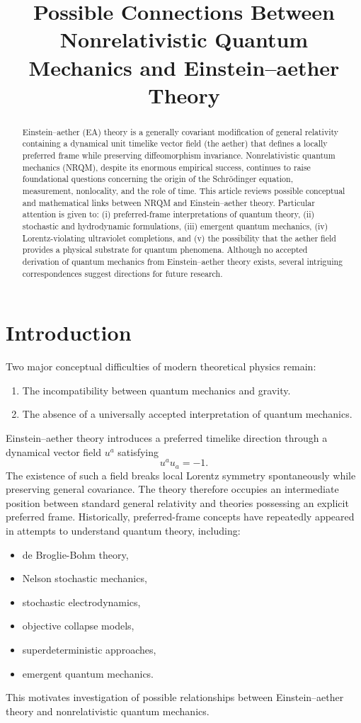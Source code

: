 \documentclass[11pt]{article}
\title{Possible Connections Between Nonrelativistic Quantum Mechanics and Einstein--aether Theory}
\author{}
\date{}
\begin{document}
\maketitle
\begin{abstract}
Einstein--aether (EA) theory is a generally covariant modification of
general relativity containing a dynamical unit timelike vector field
(the aether) that defines a locally preferred frame while preserving
diffeomorphism invariance. Nonrelativistic quantum mechanics (NRQM),
despite its enormous empirical success, continues to raise foundational
questions concerning the origin of the Schr\"odinger equation,
measurement, nonlocality, and the role of time.
This article reviews possible conceptual and mathematical links between
NRQM and Einstein--aether theory. Particular attention is given to:
(i) preferred-frame interpretations of quantum theory,
(ii) stochastic and hydrodynamic formulations,
(iii) emergent quantum mechanics,
(iv) Lorentz-violating ultraviolet completions,
and (v) the possibility that the aether field provides a physical
substrate for quantum phenomena.
Although no accepted derivation of quantum mechanics from Einstein--aether
theory exists, several intriguing correspondences suggest directions for
future research.
\end{abstract}
\section{Introduction}
Two major conceptual difficulties of modern theoretical physics remain:
\begin{enumerate}
\item The incompatibility between quantum mechanics and gravity.
\item The absence of a universally accepted interpretation of quantum
mechanics.
\end{enumerate}
Einstein--aether theory introduces a preferred timelike direction
through a dynamical vector field $u^a$ satisfying
\begin{equation}
u^a u_a = -1.
\end{equation}
The existence of such a field breaks local Lorentz symmetry
spontaneously while preserving general covariance.
The theory therefore occupies an intermediate position between
standard general relativity and theories possessing an explicit
preferred frame.
Historically, preferred-frame concepts have repeatedly appeared in
attempts to understand quantum theory, including:
\begin{itemize}
\item de Broglie-Bohm theory,
\item Nelson stochastic mechanics,
\item stochastic electrodynamics,
\item objective collapse models,
\item superdeterministic approaches,
\item emergent quantum mechanics.
\end{itemize}
This motivates investigation of possible relationships between
Einstein--aether theory and nonrelativistic quantum mechanics.
\end{document}
